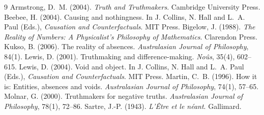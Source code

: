 \documentclass{situationist-preprint}
\begin{document}
\begin{thebibliography}{9}\small
{} Armstrong, D.~M. (2004). \emph{Truth and Truthmakers}. Cambridge University Press.
 Beebee, H. (2004). Causing and nothingness. In J. Collins, N. Hall and L.~A. Paul (Eds.), \emph{Causation and Counterfactuals}. MIT Press.
 Bigelow, J. (1988). \emph{The Reality of Numbers: A Physicalist's Philosophy of Mathematics}. Clarendon Press.
 Kukso, B. (2006). The reality of absences. \emph{Australasian Journal of Philosophy}, 84(1).
 Lewis, D. (2001). Truthmaking and difference-making. \emph{No\^us}, 35(4), 602--615.
 Lewis, D. (2004). Void and object. In J. Collins, N. Hall and L.~A. Paul (Eds.), \emph{Causation and Counterfactuals}. MIT Press.
 Martin, C.~B. (1996). How it is: Entities, absences and voids. \emph{Australasian Journal of Philosophy}, 74(1), 57--65.
 Molnar, G. (2000). Truthmakers for negative truths. \emph{Australasian Journal of Philosophy}, 78(1), 72--86.
 Sartre, J.-P. (1943). \emph{L'\^Etre et le n\'eant}. Gallimard.
\end{thebibliography}
\end{document}
